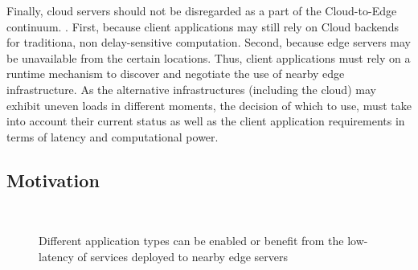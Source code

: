 
Finally, cloud servers should not be disregarded as a part of the Cloud-to-Edge continuum. %
. First, because client applications may still rely on Cloud backends for traditiona, non delay-sensitive computation. Second, because edge servers may be unavailable from the certain locations. Thus, client applications must rely on a runtime mechanism to discover and negotiate the use of nearby edge infrastructure. As the alternative infrastructures (including the cloud) may exhibit uneven loads in different moments, the decision of which to use, must take into account their current status as well as the client application requirements in terms of latency and computational power. 



\subsection{Motivation}

\begin{figure}[htbp]
	\centering
	\hfill
	~
	\hfill
	\caption{Different application types can be enabled or benefit from the low-latency of services deployed to nearby edge servers} \label{fig:motivational-cases}
\end{figure}


